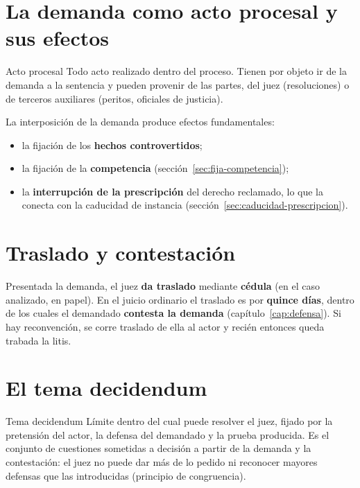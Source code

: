 \documentclass[12pt,oneside]{book}
\begin{document}
\section{La demanda como acto procesal y sus efectos}

\begin{definicion}{Acto procesal}
Todo acto realizado dentro del proceso. Tienen por objeto ir de la demanda a la sentencia y pueden provenir de las partes, del juez (resoluciones) o de terceros auxiliares (peritos, oficiales de justicia).
\end{definicion}

La interposición de la demanda produce efectos fundamentales:

\begin{itemize}
\item la fijación de los \textbf{hechos controvertidos};
\item la fijación de la \textbf{competencia} (sección~\ref{sec:fija-competencia});
\item la \textbf{interrupción de la prescripción} del derecho reclamado, lo que la conecta con la caducidad de instancia (sección~\ref{sec:caducidad-prescripcion}).
\end{itemize}

\section{Traslado y contestación}

Presentada la demanda, el juez \textbf{da traslado} mediante \textbf{cédula} (en el caso analizado, en papel). En el juicio ordinario el traslado es por \textbf{quince días}, dentro de los cuales el demandado \textbf{contesta la demanda} (capítulo~\ref{cap:defensa}). Si hay reconvención, se corre traslado de ella al actor y recién entonces queda trabada la litis.

\section{El tema decidendum}\label{sec:tema}

\begin{definicion}{Tema decidendum}
Límite dentro del cual puede resolver el juez, fijado por la pretensión del actor, la defensa del demandado y la prueba producida. Es el conjunto de cuestiones sometidas a decisión a partir de la demanda y la contestación: el juez no puede dar más de lo pedido ni reconocer mayores defensas que las introducidas (principio de congruencia).
\end{definicion}
\end{document}
